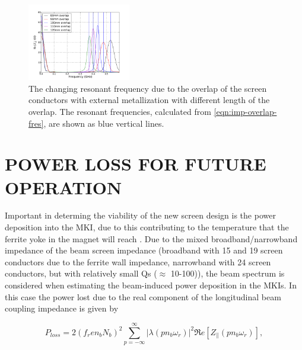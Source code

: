 \documentclass{JAC2003}
\begin{document}
\begin{figure}
\begin{center}
\includegraphics[width=0.4\textwidth]{mki-overlap-len-real-imp-zoom.pdf}
\caption{The changing resonant frequency due to the overlap of the screen conductors with external metallization with different length of the overlap. The resonant frequencies, calculated from \ref{eqn:imp-overlap-fres}, are shown as blue vertical lines.}
\label{fig:mkiOverlapRes}
\end{center}
\end{figure}

\section{POWER LOSS FOR FUTURE OPERATION}

Important in determing the viability of the new screen design is the power deposition into the MKI, due to this contributing to the temperature that the ferrite yoke in the magnet will reach \cite{mki-heatingTemp}. Due to the mixed broadband/narrowband impedance of the beam screen impedance (broadband with 15 and 19 screen conductors due to the ferrite wall impedance, narrowband with 24 screen conductors, but with relatively small Qs ($\approx$ 10-100)), the beam spectrum is considered when estimating the beam-induced power deposition in the MKIs. In this case the power lost due to the real component of the longitudinal beam coupling impedance is given by~\cite{metral_cham2012} 

\begin{equation}
P_{loss} = 2 \left( f_{r} e n_{b}  N_{b}\right)^{2} \displaystyle\sum\limits_{p = -\infty}^{\infty}  \left| \lambda \left( p n_{b} \omega_{r} \right)  \right|^{2} \Re{}e \left[ Z_{\parallel} \left( p n_{b}\omega_{r} \right) \right],
\label{eqn:heating-gen}
\end{equation} 
\end{document}
